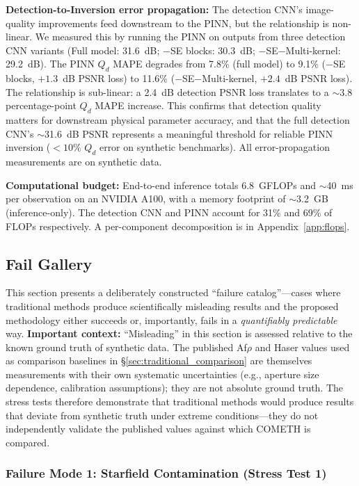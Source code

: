\documentclass[usenatbib]{mnras}
\begin{document}
\textbf{Detection-to-Inversion error propagation:} The detection CNN's image-quality improvements feed downstream to the PINN, but the relationship is non-linear. We measured this by running the PINN on outputs from three detection CNN variants (Full model: 31.6~dB; $-$SE blocks: 30.3~dB; $-$SE$-$Multi-kernel: 29.2~dB). The PINN $Q_d$ MAPE degrades from 7.8\% (full model) to 9.1\% ($-$SE blocks, $+1.3$~dB PSNR loss) to 11.6\% ($-$SE$-$Multi-kernel, $+2.4$~dB PSNR loss). The relationship is sub-linear: a 2.4~dB detection PSNR loss translates to a $\sim$3.8 percentage-point $Q_d$ MAPE increase. This confirms that detection quality matters for downstream physical parameter accuracy, and that the full detection CNN's $\sim$31.6~dB PSNR represents a meaningful threshold for reliable PINN inversion ($<10\%$ $Q_d$ error on synthetic benchmarks). All error-propagation measurements are on synthetic data.

\textbf{Computational budget:} End-to-end inference totals 6.8~GFLOPs and $\sim$40~ms per observation on an NVIDIA A100, with a memory footprint of $\sim$3.2~GB (inference-only). The detection CNN and PINN account for 31\% and 69\% of FLOPs respectively. A per-component decomposition is in Appendix~\ref{app:flops}.


\subsection{Fail Gallery}\label{sec:fail_gallery}

This section presents a deliberately constructed ``failure catalog''---cases where traditional methods produce scientifically misleading results and the proposed methodology either succeeds or, importantly, fails in a \textit{quantifiably predictable} way. \textbf{Important context:} ``Misleading'' in this section is assessed relative to the known ground truth of synthetic data. The published Af$\rho$ and Haser values used as comparison baselines in \S\ref{sec:traditional_comparison} are themselves measurements with their own systematic uncertainties (e.g., aperture size dependence, calibration assumptions); they are not absolute ground truth. The stress tests therefore demonstrate that traditional methods would produce results that deviate from synthetic truth under extreme conditions---they do not independently validate the published values against which COMETH is compared.

\subsubsection{Failure Mode 1: Starfield Contamination (Stress Test 1)}
\end{document}
